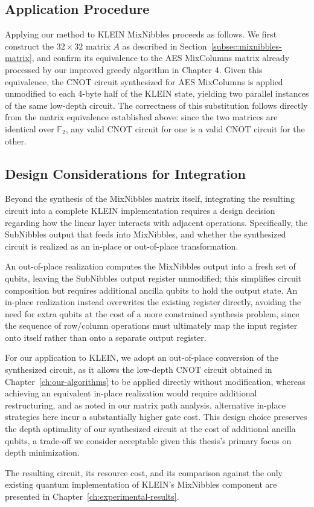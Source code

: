 \subsection{Application Procedure}
Applying our method to KLEIN MixNibbles proceeds as follows. We first construct the $32 \times 32$ matrix $A$ as described in Section~\ref{subsec:mixnibbles-matrix}, and confirm its equivalence to the AES MixColumns matrix already processed by our improved greedy algorithm in Chapter 4. Given this equivalence, the CNOT circuit synthesized for AES MixColumns is applied unmodified to each 4-byte half of the KLEIN state, yielding two parallel instances of the same low-depth circuit. The correctness of this substitution follows directly from the matrix equivalence established above: since the two matrices are identical over $\mathbb{F}_{2}$​, any valid CNOT circuit for one is a valid CNOT circuit for the other.

\subsection{Design Considerations for Integration}
Beyond the synthesis of the MixNibbles matrix itself, integrating the resulting circuit into a complete KLEIN implementation requires a design decision regarding how the linear layer interacts with adjacent operations. Specifically, the SubNibbles output that feeds into MixNibbles, and whether the synthesized circuit is realized as an in-place or out-of-place transformation.

An out-of-place realization computes the MixNibbles output into a fresh set of qubits, leaving the SubNibbles output register unmodified; this simplifies circuit composition but requires additional ancilla qubits to hold the output state. An in-place realization instead overwrites the existing register directly, avoiding the need for extra qubits at the cost of a more constrained synthesis problem, since the sequence of row/column operations must ultimately map the input register onto itself rather than onto a separate output register.

For our application to KLEIN, we adopt an out-of-place conversion of the synthesized circuit, as it allows the low-depth CNOT circuit obtained in Chapter~\ref{ch:our-algorithms} to be applied directly without modification, whereas achieving an equivalent in-place realization would require additional restructuring, and as noted in our matrix path analysis, alternative in-place strategies here incur a substantially higher gate cost. This design choice preserves the depth optimality of our synthesized circuit at the cost of additional ancilla qubits, a trade-off we consider acceptable given this thesis's primary focus on depth minimization.

The resulting circuit, its resource cost, and its comparison against the only existing quantum implementation of KLEIN's MixNibbles component are presented in Chapter~\ref{ch:experimental-results}.